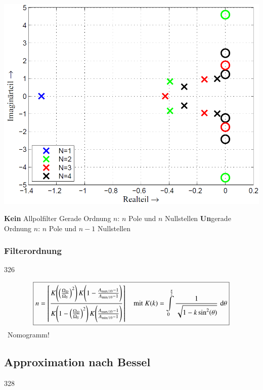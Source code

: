 \begin{minipage}[c]{0.4\columnwidth}
    \includegraphics[width=\columnwidth]{images/filter_cauer_pollage.png}
\end{minipage}
\hfill
\begin{minipage}[c]{0.58\columnwidth}
    \begin{outline}
        \1 \textbf{Kein} Allpolfilter
            \2 Gerade Ordnung $n$: $n$ Pole und $n$ Nullstellen
            \2 \textbf{Un}gerade Ordnung $n$: $n$ Pole und $n-1$ Nullstellen
    \end{outline}
\end{minipage}


\subsubsection{Filterordnung}{326}

$$ \boxed{ n = \left\lceil \frac{ K \Bigg( \Big( \frac{\Omega_D}{\Omega_S} \Big)^2 \Bigg) \, K \Bigg( 1 - \frac{A_{\rm max / 10} - 1}{A_{\rm min / 10} - 1} \Bigg) }
    { K \Bigg( 1 -\Big( \frac{\Omega_D}{\Omega_S} \Big)^2 \Bigg) \, K \Bigg(\frac{A_{\rm max / 10} - 1}{A_{\rm min / 10} - 1} \Bigg) }  \right\rceil 
    \quad \text{mit } K(k) = \int\limits_{0}^{\frac{\pi}{2} }  \frac{1}{\sqrt{1- k \sin^2(\theta)}} \, \mathop{} \! \mathrm{d} \theta }$$
    \textrightarrow\ Nomogramm!


\subsection{Approximation nach Bessel}{328}

